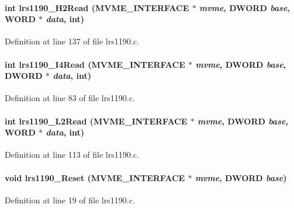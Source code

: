 \paragraph[{lrs1190\_\-H2Read}]{\setlength{\rightskip}{0pt plus 5cm}int lrs1190\_\-H2Read ({\bf MVME\_\-INTERFACE} $\ast$ {\em mvme}, \/  {\bf DWORD} {\em base}, \/  {\bf WORD} $\ast$ {\em data}, \/  int)}\hfill\label{lrs1190_8h_a8749b89f97aaff1bc777671db6e1e5f8}


Definition at line 137 of file lrs1190.c.
\paragraph[{lrs1190\_\-I4Read}]{\setlength{\rightskip}{0pt plus 5cm}int lrs1190\_\-I4Read ({\bf MVME\_\-INTERFACE} $\ast$ {\em mvme}, \/  {\bf DWORD} {\em base}, \/  {\bf DWORD} $\ast$ {\em data}, \/  int)}\hfill\label{lrs1190_8h_a7d4b393ab63b9bf656be093d71499c7c}


Definition at line 83 of file lrs1190.c.
\paragraph[{lrs1190\_\-L2Read}]{\setlength{\rightskip}{0pt plus 5cm}int lrs1190\_\-L2Read ({\bf MVME\_\-INTERFACE} $\ast$ {\em mvme}, \/  {\bf DWORD} {\em base}, \/  {\bf WORD} $\ast$ {\em data}, \/  int)}\hfill\label{lrs1190_8h_abfd68668ee12ab2b900d7fe200b42f56}


Definition at line 113 of file lrs1190.c.
\paragraph[{lrs1190\_\-Reset}]{\setlength{\rightskip}{0pt plus 5cm}void lrs1190\_\-Reset ({\bf MVME\_\-INTERFACE} $\ast$ {\em mvme}, \/  {\bf DWORD} {\em base})}\hfill\label{lrs1190_8h_aefc59eb1c2a33917cdc02e2538e72d72}


Definition at line 19 of file lrs1190.c.